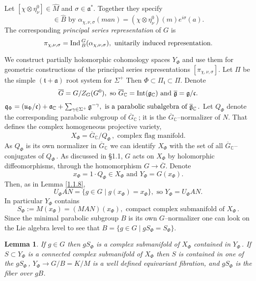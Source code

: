 \documentclass{conm-p-l}
\newtheorem{lemma}[equation]{Lemma}
\renewcommand{\gg}{\mathfrak{g}}
\newcommand{\gq}{\mathfrak{q}}
\def\ga{\mathfrak{a}}
\def\gc{\mathfrak{c}}
\def\gg{\mathfrak{g}}
\def\gq{\mathfrak{q}}
\def\gt{\mathfrak{t}}
\def\gu{\mathfrak{u}}
\def\Int{{\rm Int}}
\def\Ind{{\rm Ind\,}}
\def\C{\mathbb{C}}
\begin{document}
Let $[\chi \otimes \eta_\nu^0] \in \widehat{M}$ and $\sigma \in \ga^*$.
Together they specify 
\begin{equation}
[\alpha_{\chi,\nu,\sigma}] \in \widehat{B} \text{ by }
	\alpha_{\chi,\nu,\sigma}(man) = 
	(\chi \otimes \eta_\nu^0)(m)e^{i\sigma}(a).
\end{equation}
The corresponding {\em principal series representation} of $G$ is
\begin{equation}\label{1.2.8}
\pi_{\chi,\nu,\sigma} = \Ind_B^G(\alpha_{\chi,\nu,\sigma}), 
	\text{ unitarily induced representation.}
\end{equation}

We construct partially holomorphic cohomology spaces $Y_\Phi$ and use them
for geometric constructions of the principal series representations
$[\pi_{\chi,\nu,\sigma}]$.  Let $\Pi$ be the simple $(\gt + \ga)$ root
system for $\Sigma^+$  Then $\Phi \subset \Pi_\gt \subset \Pi$.  Denote
\begin{equation}\label{1.2.9}
\overline{G} = G/Z_G(G^0), \text{ so } \overline{G}_\C = \Int(\gg_\C)
\text{ and } \overline{\gg} = \gg/\gc.
\end{equation} 
$\gq_\Phi = (\gu_\Phi/\gc)+ \ga_\C +{\sum}_{\gamma \in \Sigma^+}\,\gg^{-\gamma},
\text{ is a parabolic subalgebra of $\overline{\gg}_\C$\,.}$
Let $Q_\Phi$ denote the corresponding parabolic subgroup of $\overline{G}_\C$\,;
it is the $\overline{G}_\C$--normalizer of $N$. 
That defines the complex homogeneous projective variety,
\begin{equation}
X_\Phi = \overline{G}_\C/Q_\Phi\,,  \text{ complex flag manifold.} 
\end{equation}
As $Q_\Phi$ is its own normalizer in $\overline{G}_\C$ we can identify $X_\Phi$
with the set of all $\overline{G}_\C$--conjugates of $Q_\Phi$\,.
As discussed in \S 1.1, $G$ acts on $X_\Phi$ by holomorphic diffeomorphisms,
through the homomorphism $G \to \overline{G}$.  Denote 
$$
x_\Phi = 1\cdot Q_\Phi \in X_\Phi \text{ and } Y_\Phi = G(x_\Phi).
$$
Then, as in Lemma \ref{1.1.8}, 
\begin{equation}\label{1.2.10}
U_\Phi AN = \{g \in G \mid g(x_\Phi) = x_\Phi\}, \text{ so } Y_\Phi = U_\Phi AN.
\end{equation}
In particular $Y_\Phi$ contains
$$
S_\Phi := M(x_\Phi) = (MAN)(x_\Phi), 
	\text{ compact complex submanifold of } X_\Phi\,.
$$
Since the minimal parabolic subgroup $B$ is its own $G$--normalizer one
can look on the Lie algebra level to see that $B = \{g \in G \mid gS_\Phi
= S_\Phi\}$.
\begin{lemma}\label{1.2.12}
If $g \in G$ then $gS_\Phi$ is a complex submanifold of $X_\Phi$ contained
in $Y_\Phi$\,.  If $S \subset Y_\Phi$ is a connected  complex submanifold of
$X_\Phi$ then $S$ is contained in one of the $gS_\Phi$\,,
$Y_\Phi \to G/B = K/M$
is a well defined equivariant fibration, and $gS_\Phi$ is the fiber over $gB$.
\end{lemma}
\end{document}
